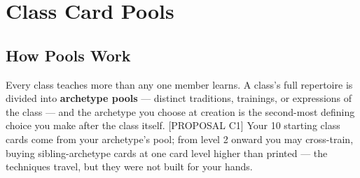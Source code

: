 %
%

\chapter{Class Card Pools}

\section{How Pools Work}

Every class teaches more than any one member learns. A class's full repertoire is divided into \textbf{archetype pools} --- distinct traditions, trainings, or expressions of the class --- and the archetype you choose at creation is the second-most defining choice you make after the class itself. [PROPOSAL C1] Your 10 starting class cards come from your archetype's pool; from level 2 onward you may cross-train, buying sibling-archetype cards at one card level higher than printed --- the techniques travel, but they were not built for your hands.


